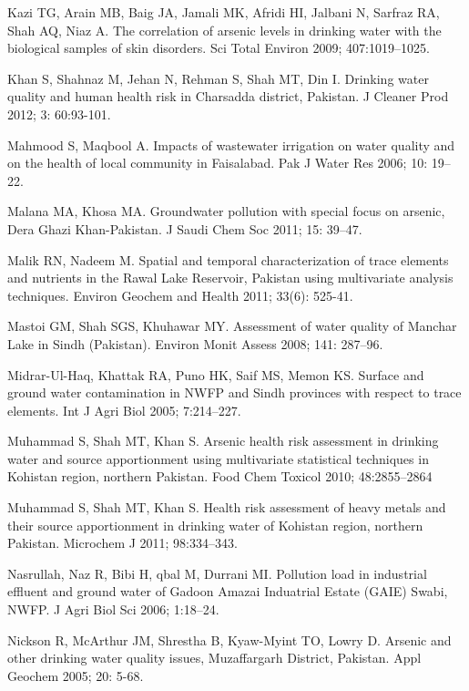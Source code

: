 \begin{thebibliography}
\bibitem{} \hangindent=1cm Kazi TG, Arain MB, Baig JA, Jamali MK, Afridi HI, Jalbani N, Sarfraz RA, Shah AQ, Niaz A. The correlation of arsenic levels in drinking water with the biological samples of skin disorders. Sci Total Environ 2009; 407:1019–1025.

\bibitem{} \hangindent=1cm Khan S, Shahnaz M, Jehan N, Rehman S, Shah MT, Din I. Drinking water quality and human health risk in Charsadda district, Pakistan. J Cleaner Prod 2012; 3: 60:93-101.

\bibitem{} \hangindent=1cm Mahmood S, Maqbool A. Impacts of wastewater irrigation on water quality and on the health of local community in Faisalabad. Pak J Water Res 2006; 10: 19–22.

\bibitem{} \hangindent=1cm Malana MA, Khosa MA. Groundwater pollution with special focus on arsenic, Dera Ghazi Khan-Pakistan. J Saudi Chem Soc 2011; 15: 39–47.

\bibitem{} \hangindent=1cm Malik RN, Nadeem M. Spatial and temporal characterization of trace elements and nutrients in the Rawal Lake Reservoir, Pakistan using multivariate analysis techniques. Environ Geochem and Health  2011; 33(6): 525-41.

\bibitem{} \hangindent=1cm Mastoi GM, Shah SGS, Khuhawar MY. Assessment of water quality of Manchar Lake in Sindh (Pakistan). Environ Monit Assess 2008; 141: 287–96.

\bibitem{} \hangindent=1cm Midrar-Ul-Haq, Khattak RA, Puno HK, Saif MS, Memon KS. Surface and ground water contamination in NWFP and Sindh provinces with respect to trace elements. Int J Agri Biol 2005; 7:214–227.

\bibitem{} \hangindent=1cm Muhammad S, Shah MT, Khan S. Arsenic health risk assessment in drinking water and source apportionment using multivariate statistical techniques in Kohistan region, northern Pakistan. Food Chem Toxicol 2010; 48:2855–2864

\bibitem{} \hangindent=1cm Muhammad S, Shah MT, Khan S. Health risk assessment of heavy metals and their source apportionment in drinking water of Kohistan region, northern Pakistan. Microchem J 2011; 98:334–343.

\bibitem{} \hangindent=1cm Nasrullah, Naz R, Bibi H, qbal M, Durrani MI. Pollution load in industrial effluent and ground water of Gadoon Amazai Induatrial Estate (GAIE) Swabi, NWFP. J Agri Biol Sci 2006; 1:18–24.

\bibitem{} \hangindent=1cm Nickson R, McArthur JM, Shrestha B, Kyaw-Myint TO, Lowry D. Arsenic and other drinking water quality issues, Muzaffargarh District, Pakistan. Appl Geochem 2005; 20: 5-68.


\end{thebibliography}
